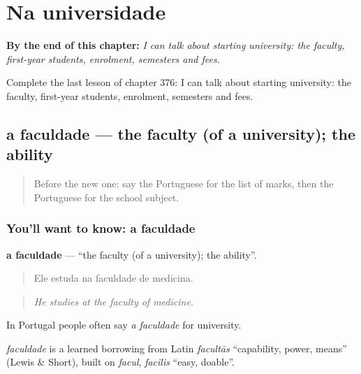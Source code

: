 
\chapter{Na universidade}
\label{ch:pt-na-universidade}

\begin{chapteropening}
\textbf{By the end of this chapter:} \emph{I can talk about starting university: the faculty, first-year students, enrolment, semesters and fees.}

Complete the last lesson of chapter 376: I can talk about starting university: the faculty, first-year students, enrolment, semesters and fees.
\end{chapteropening}

\section[a faculdade]{a faculdade — the faculty (of a university); the ability}

\label{lesson:PT-C376-faculdade}



\begin{quote}
Before the new one: say the Portuguese for the list of marks, then the Portuguese for the school subject.
\end{quote}

\subsection*{You'll want to know: a faculdade}
\textbf{a faculdade} — \textquotedblleft{}the faculty (of a university); the ability\textquotedblright{}.

\begin{quote}
Ele estuda na faculdade de medicina.
\end{quote}

\begin{quote}
\emph{He studies at the faculty of medicine.}
\end{quote}

In Portugal people often say \emph{a faculdade} for university.

\begin{cousinweb}
\emph{faculdade} is a learned borrowing from Latin \emph{facultās} \textquotedblleft{}capability, power, means\textquotedblright{} (Lewis \& Short), built on \emph{facul}, \emph{facilis} \textquotedblleft{}easy, doable\textquotedblright{}.
\end{cousinweb}

